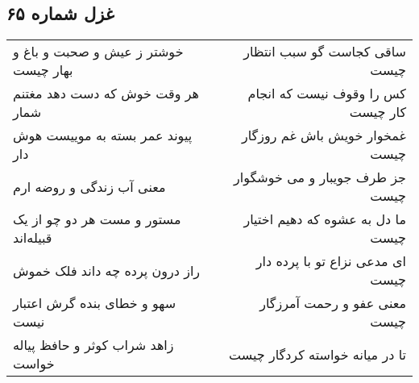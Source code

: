 \begin{center}
\section*{غزل شماره ۶۵}
\label{sec:sh065}
\begin{longtable}{l p{0.5cm} r}
خوشتر ز عیش و صحبت و باغ و بهار چیست
&&
ساقی کجاست گو سبب انتظار چیست
\\
هر وقت خوش که دست دهد مغتنم شمار
&&
کس را وقوف نیست که انجام کار چیست
\\
پیوند عمر بسته به موییست هوش دار
&&
غمخوار خویش باش غم روزگار چیست
\\
معنی آب زندگی و روضه ارم
&&
جز طرف جویبار و می خوشگوار چیست
\\
مستور و مست هر دو چو از یک قبیله‌اند
&&
ما دل به عشوه که دهیم اختیار چیست
\\
راز درون پرده چه داند فلک خموش
&&
ای مدعی نزاع تو با پرده دار چیست
\\
سهو و خطای بنده گرش اعتبار نیست
&&
معنی عفو و رحمت آمرزگار چیست
\\
زاهد شراب کوثر و حافظ پیاله خواست
&&
تا در میانه خواسته کردگار چیست
\\
\end{longtable}
\end{center}
